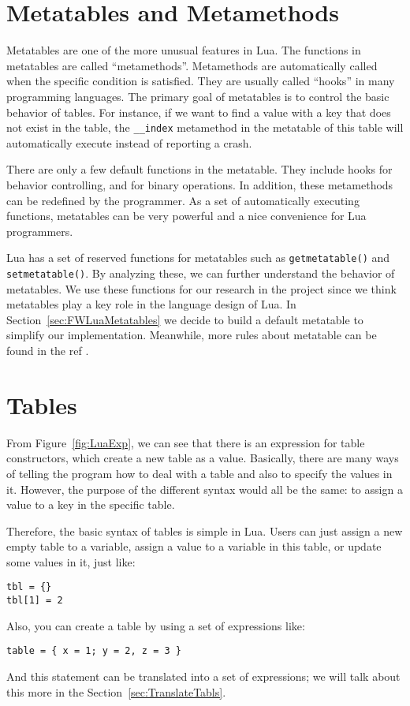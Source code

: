 \section{Metatables and Metamethods}
Metatables are one of the more unusual features in Lua. The functions in metatables are called ``metamethods''. Metamethods are automatically called when the specific condition is satisfied. They are usually called ``hooks'' in many programming languages. The primary goal of metatables is to control the basic behavior of tables. For instance, if we want to find a value with a key that does not exist in the table, the {\tt \_\_index} metamethod in the metatable of this table will automatically execute instead of reporting a crash.

There are only a few default functions in the metatable. They include hooks for behavior controlling, and for binary operations. In addition, these metamethods can be redefined by the programmer. As a set of automatically executing functions, metatables can be very powerful and a nice convenience for Lua programmers.

Lua has a set of reserved functions for metatables such as {\tt getmetatable()} and {\tt setmetatable()}. By analyzing these, we can further understand the behavior of metatables. We use these functions for our research in the project since we think metatables play a key role in the language design of Lua.
In Section~\ref{sec:FWLuaMetatables} we decide to build a default metatable to simplify our implementation. Meanwhile, more rules about metatable can be found in the ref \cite{LRM}.

\section{Tables}\label{sec: LuaTable}
From Figure~\ref{fig:LuaExp}, we can see that there is an expression for table constructors, which create a new table as a value. Basically, there are many ways of telling the program how to deal with a table and also to specify the values in it. However, the purpose of the different syntax would all be the same: to assign a value to a key in the specific table.

Therefore, the basic syntax of tables is simple in Lua. Users can just assign a new empty table to a variable, assign a value to a variable in this table, or update some values in it, just like:
\begin{flushleft}
\tt tbl = \{\} \\
\tt tbl[1] = 2 \\
\end{flushleft}
Also, you can create a table by using a set of expressions like:
\begin{flushleft}
\tt table = \{ x = 1; y = 2, z = 3 \} \\
\end{flushleft}
And this statement can be translated into a set of expressions; we will talk about this more in the Section~\ref{sec:TranslateTabls}.


